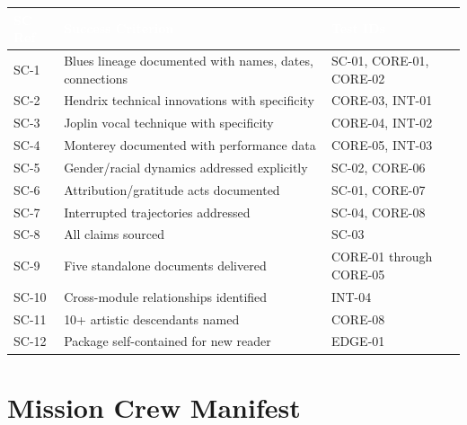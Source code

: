 \documentclass[11pt,letterpaper]{article}
\newcommand{\tableheader}[1]{\textbf{\sffamily\textcolor{white}{#1}}}
\begin{document}
\begin{center}
\begin{tabularx}{\textwidth}{L{1.5cm}L{4cm}X}
\toprule
{}
\tableheader{SC Ref} & \tableheader{Success Criterion} & \tableheader{Test IDs} \\
\midrule
SC-1 & Blues lineage documented with names, dates, connections & SC-01, CORE-01, CORE-02 \\
SC-2 & Hendrix technical innovations with specificity & CORE-03, INT-01 \\
SC-3 & Joplin vocal technique with specificity & CORE-04, INT-02 \\
SC-4 & Monterey documented with performance data & CORE-05, INT-03 \\
SC-5 & Gender/racial dynamics addressed explicitly & SC-02, CORE-06 \\
SC-6 & Attribution/gratitude acts documented & SC-01, CORE-07 \\
SC-7 & Interrupted trajectories addressed & SC-04, CORE-08 \\
SC-8 & All claims sourced & SC-03 \\
SC-9 & Five standalone documents delivered & CORE-01 through CORE-05 \\
SC-10 & Cross-module relationships identified & INT-04 \\
SC-11 & 10+ artistic descendants named & CORE-08 \\
SC-12 & Package self-contained for new reader & EDGE-01 \\
\bottomrule
\end{tabularx}
\end{center}

\section{Mission Crew Manifest}
\end{document}
